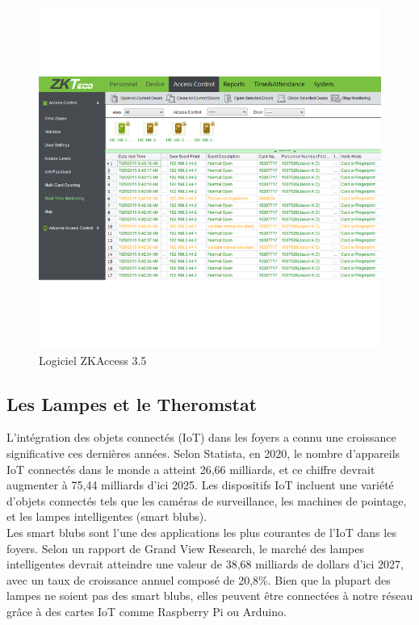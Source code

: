 \begin{figure}[H]
 \centering
    \includegraphics[width=15cm]{Images/ZKAccess3-Logiciel.png}
    \caption{Logiciel ZKAccess 3.5}
    \label{Chap4.2.6}
\end{figure}    
\smallskip

\subsection{Les Lampes et le Theromstat}

L'intégration des objets connectés (IoT) dans les foyers a connu une croissance significative ces dernières années. Selon Statista, en 2020, le nombre d'appareils IoT connectés dans le monde a atteint 26,66 milliards, et ce chiffre devrait augmenter à 75,44 milliards d'ici 2025. Les dispositifs IoT incluent une variété d'objets connectés tels que les caméras de surveillance, les machines de pointage, et les lampes intelligentes (smart blubs). \\

Les smart blubs sont l'une des applications les plus courantes de l'IoT dans les foyers. Selon un rapport de Grand View Research, le marché des lampes intelligentes devrait atteindre une valeur de 38,68 milliards de dollars d'ici 2027, avec un taux de croissance annuel composé de 20,8\%. Bien que la plupart des lampes ne soient pas des smart blubs, elles peuvent être connectées à notre réseau grâce à des cartes IoT comme Raspberry Pi ou Arduino. \cite{gazis2021iot}\\

